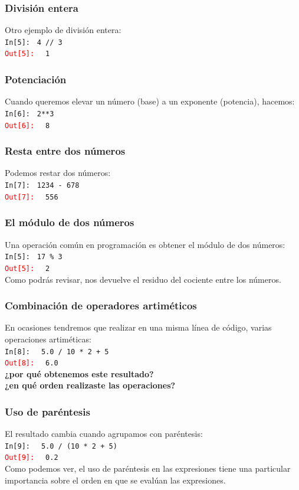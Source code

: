 \documentclass[12pt]{beamer}
\begin{document}
\begin{frame}[fragile]
\frametitle{División entera}
Otro ejemplo de división entera:
\\
\bigskip
\textcolor{ao}{\texttt{In[5]: }} \verb|4 // 3| \\
\pause
\textcolor{red}{\texttt{Out[5]: }} \verb| 1|
\end{frame}
\begin{frame}[fragile]
\frametitle{Potenciación}
Cuando queremos elevar un número (base) a un exponente (potencia), hacemos:
\\
\bigskip
\textcolor{ao}{\texttt{In[6]: }} \verb|2**3| \\
\pause
\textcolor{red}{\texttt{Out[6]: }} \verb| 8|
\end{frame}
\begin{frame}[fragile]
\frametitle{Resta entre dos números}
Podemos restar dos números:
\\
\bigskip
\textcolor{ao}{\texttt{In[7]: }} \verb|1234 - 678| \\
\pause
\textcolor{red}{\texttt{Out[7]: }} \verb| 556|
\end{frame}
\begin{frame}[fragile]
\frametitle{El módulo de dos números}
Una operación común en programación es obtener el módulo de dos números:
\\
\bigskip
\textcolor{ao}{\texttt{In[5]: }} \verb|17 % 3| \\
\pause
\textcolor{red}{\texttt{Out[5]: }} \verb| 2|
\\
\bigskip
\pause
Como podrás revisar, nos devuelve el residuo del cociente entre los números.
\end{frame}
\begin{frame}[fragile]
\frametitle{Combinación de operadores artiméticos}
En ocasiones tendremos que realizar en una misma línea de código, varias operaciones artiméticas:
\\
\bigskip
\textcolor{ao}{\texttt{In[8]: }} \verb| 5.0 / 10 * 2 + 5| \\
\pause
\textcolor{red}{\texttt{Out[8]: }} \verb| 6.0|
\pause
\\
\bigskip
\textbf{¿por qué obtenemos este resultado?}
\\
\bigskip
\pause
\textbf{¿en qué orden realizaste las operaciones?}
\end{frame}
\begin{frame}[fragile]
\frametitle{Uso de paréntesis}
El resultado cambia cuando agrupamos con paréntesis:
\\
\bigskip
\textcolor{ao}{\texttt{In[9]: }} \verb| 5.0 / (10 * 2 + 5)| \\
\pause
\textcolor{red}{\texttt{Out[9]: }} \verb| 0.2|
\pause
\\
\bigskip
Como podemos ver, el uso de paréntesis en las expresiones tiene una particular importancia sobre el orden en que se evalúan las expresiones.
\end{frame}
\end{document}
